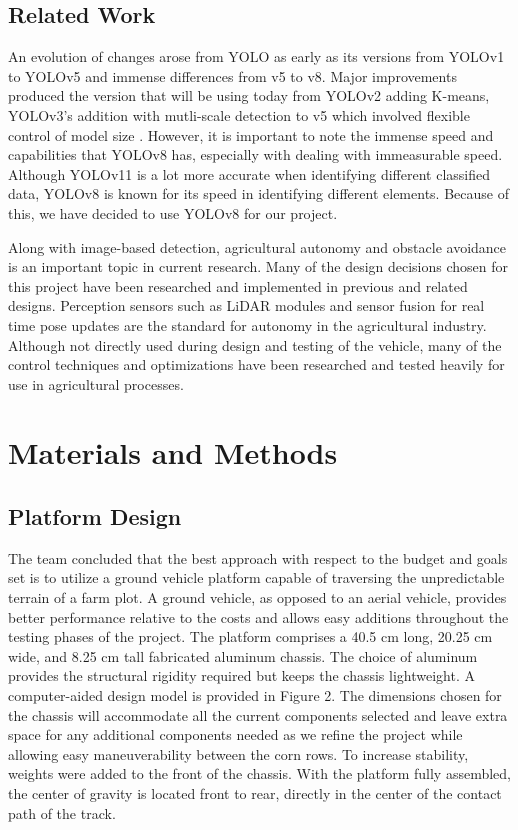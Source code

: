 \documentclass[conference]{IEEEtran}
\begin{document}
\subsection{Related Work}

An evolution of changes arose from YOLO as early as its versions from YOLOv1 to YOLOv5 and immense differences from v5 to v8. Major improvements produced the version that will be using today from YOLOv2 adding K-means, YOLOv3’s addition with mutli-scale detection to v5 which involved flexible control of model size \cite{b1}. However, it is important to note the immense speed and capabilities that YOLOv8 has, especially with dealing with immeasurable speed. Although YOLOv11 is a lot more accurate when identifying different classified data\cite{b2}, YOLOv8 is known for its speed in identifying different elements. Because of this, we have decided to use YOLOv8 for our project.

Along with image-based detection, agricultural autonomy and obstacle avoidance is an important topic in current research. Many of the design decisions chosen for this project have been researched and implemented in previous and related designs. Perception sensors such as LiDAR modules and sensor fusion for real time pose updates are the standard for autonomy in the agricultural industry\cite{b3}. Although not directly used during design and testing of the vehicle, many of the control techniques and optimizations have been researched and tested heavily for use in agricultural processes\cite{b4}.


\section{Materials and Methods}

\subsection{Platform Design}
The team concluded that the best approach with respect to the budget and goals set is to utilize a ground vehicle platform capable of traversing the unpredictable terrain of a farm plot. A ground vehicle, as opposed to an aerial vehicle, provides better performance relative to the costs and allows easy additions throughout the testing phases of the project. The platform comprises a 40.5 cm long, 20.25 cm wide, and 8.25 cm tall fabricated aluminum chassis. The choice of aluminum provides the structural rigidity required but keeps the chassis lightweight. A computer-aided design model is provided in Figure 2. The dimensions chosen for the chassis will accommodate all the current components selected and leave extra space for any additional components needed as we refine the project while allowing easy maneuverability between the corn rows. To increase stability, weights were added to the front of the chassis. With the platform fully assembled, the center of gravity is located front to rear, directly in the center of the contact path of the track.
\end{document}
